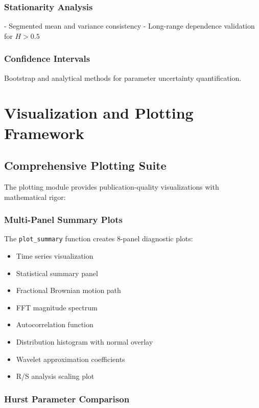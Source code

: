 \documentclass[11pt,a4paper]{article}
\begin{document}
\subsubsection{Stationarity Analysis}
- Segmented mean and variance consistency
- Long-range dependence validation for $H > 0.5$

\subsubsection{Confidence Intervals}
Bootstrap and analytical methods for parameter uncertainty quantification.

\section{Visualization and Plotting Framework}

\subsection{Comprehensive Plotting Suite}

The plotting module provides publication-quality visualizations with mathematical rigor:

\subsubsection{Multi-Panel Summary Plots}

The \texttt{plot\_summary} function creates 8-panel diagnostic plots:
\begin{itemize}
    \item Time series visualization
    \item Statistical summary panel
    \item Fractional Brownian motion path
    \item FFT magnitude spectrum
    \item Autocorrelation function
    \item Distribution histogram with normal overlay
    \item Wavelet approximation coefficients
    \item R/S analysis scaling plot
\end{itemize}

\subsubsection{Hurst Parameter Comparison}
\end{document}
